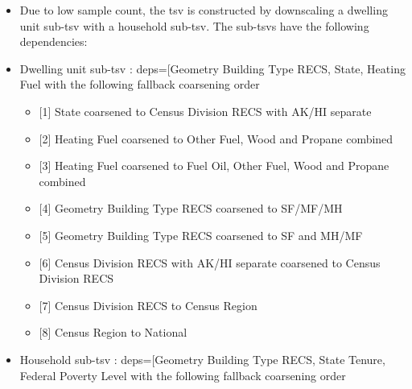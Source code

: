 \begin{itemize}
 
\item
  Due to low sample count, the tsv is constructed by downscaling a
  dwelling unit sub-tsv with a household sub-tsv. The sub-tsvs have the
  following dependencies:
\item
  Dwelling unit sub-tsv : deps={[}\textquotesingle Geometry Building
  Type RECS\textquotesingle, \textquotesingle State\textquotesingle,
  \textquotesingle Heating Fuel\textquotesingle{]} with the following
  fallback coarsening order

  \begin{itemize}
   
  \item
    {[}1{]} State coarsened to Census Division RECS with AK/HI separate
  \item
    {[}2{]} Heating Fuel coarsened to Other Fuel, Wood and Propane
    combined
  \item
    {[}3{]} Heating Fuel coarsened to Fuel Oil, Other Fuel, Wood and
    Propane combined
  \item
    {[}4{]} Geometry Building Type RECS coarsened to SF/MF/MH
  \item
    {[}5{]} Geometry Building Type RECS coarsened to SF and MH/MF
  \item
    {[}6{]} Census Division RECS with AK/HI separate coarsened to Census
    Division RECS
  \item
    {[}7{]} Census Division RECS to Census Region
  \item
    {[}8{]} Census Region to National
  \end{itemize}
\item
  Household sub-tsv : deps={[}\textquotesingle Geometry Building Type
  RECS\textquotesingle, \textquotesingle State\textquotesingle{}
  \textquotesingle Tenure\textquotesingle, \textquotesingle Federal
  Poverty Level\textquotesingle{]} with the following fallback
  coarsening order

  \begin{itemize}
   

\end{itemize}
\end{itemize}
